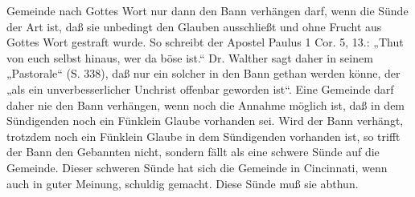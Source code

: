 Gemeinde nach Gottes Wort nur dann den Bann verhängen darf, wenn die Sünde der Art ist, daß sie unbedingt den Glauben ausschließt und ohne Frucht aus Gottes Wort gestraft wurde. So schreibt der Apostel Paulus 1 Cor. 5, 13.: „Thut von euch selbst hinaus, wer da böse ist.“ Dr. Walther sagt daher in seinem „Pastorale“ (S. 338), daß nur ein solcher in den Bann gethan werden könne, der „als ein unverbesserlicher Unchrist offenbar geworden ist“. Eine Gemeinde darf daher nie den Bann verhängen, wenn noch die Annahme möglich ist, daß in dem Sündigenden noch ein Fünklein Glaube vorhanden sei. Wird der Bann verhängt, trotzdem noch ein Fünklein Glaube in dem Sündigenden vorhanden ist, so trifft der Bann den Gebannten nicht, sondern fällt als eine schwere Sünde auf die Gemeinde. Dieser schweren Sünde hat sich die Gemeinde in Cincinnati, wenn auch in guter Meinung, schuldig gemacht. Diese Sünde muß sie abthun.


